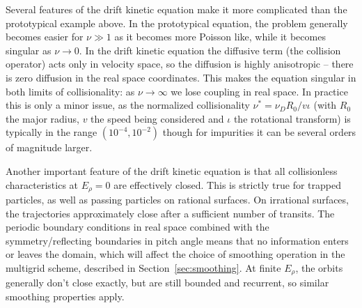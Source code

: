 \documentclass[11pt]{article}
\begin{document}
Several features of the drift kinetic equation make it more
complicated than the prototypical example above. In the prototypical equation, the
problem generally becomes easier for $\nu \gg 1$ as it becomes more Poisson
like, while it becomes singular as $\nu \rightarrow 0$. In the drift kinetic
equation the diffusive term (the collision operator) acts only in velocity
space, so the diffusion is highly anisotropic -- there is zero diffusion in the
real space coordinates. This makes the equation singular in both limits of
collisionality: as $\nu \rightarrow \infty$ we lose coupling in real space. In
practice this is only a minor issue, as the normalized collisionality
$\nu^* = \nu_D R_0/ v \iota$ (with $R_0$ the major radius, $v$ the speed being
considered and $\iota$ the rotational transform)
is typically in the range $(10^{-4}, 10^{-2})$ though for impurities it can be
several orders of magnitude larger.

Another important feature of the drift kinetic equation is that all
collisionless characteristics at $E_\rho=0$ are effectively closed. This is strictly true for
trapped particles, as well as passing particles on rational surfaces. On
irrational surfaces, the trajectories approximately close after a sufficient
number of transits. The periodic boundary conditions in real space combined
with the symmetry/reflecting boundaries in pitch angle means that no
information enters or leaves the domain, which will affect the choice of
smoothing operation in the multigrid scheme, described in
Section~\ref{sec:smoothing}. At finite $E_\rho$, the orbits generally don't close exactly,
but are still bounded and recurrent, so similar smoothing properties apply.
\end{document}
